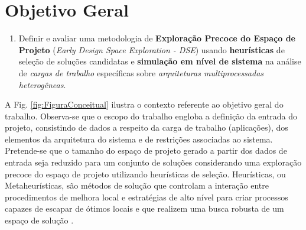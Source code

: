 \documentclass[tese-proposta,nocipinfo]{texufpel}
\begin{document}
\section{Objetivo Geral}

\begin{enumerate}[start=0]

\item {Definir e avaliar uma metodologia de \textbf{Exploração Precoce do Espaço de Projeto} (\textit{Early Design Space Exploration - DSE}) usando \textbf{heurísticas} de seleção de soluções candidatas e \textbf{simulação em nível de sistema} na análise de \textit{cargas de trabalho} específicas sobre \textit{arquiteturas multiprocessadas heterogêneas}}.
\end{enumerate}

A Fig. \ref{fig:FiguraConceitual} ilustra o contexto referente ao objetivo geral do trabalho. Observa-se que o escopo do trabalho engloba a definição da entrada do projeto, consistindo de dados a respeito da carga de trabalho (aplicações), dos elementos da arquitetura do sistema e de restrições associadas ao sistema. Pretende-se que o tamanho do espaço de projeto gerado a partir dos dados de entrada seja reduzido para um conjunto de soluções considerando uma exploração precoce do espaço de projeto utilizando heurísticas de seleção.
Heurísticas, ou Metaheurísticas, são métodos de solução que controlam a interação entre procedimentos de melhora local e estratégias de alto nível para criar processos capazes de escapar de ótimos locais e que realizem uma busca robusta de um espaço de solução \cite{gendreau2010handbook}.
\end{document}
